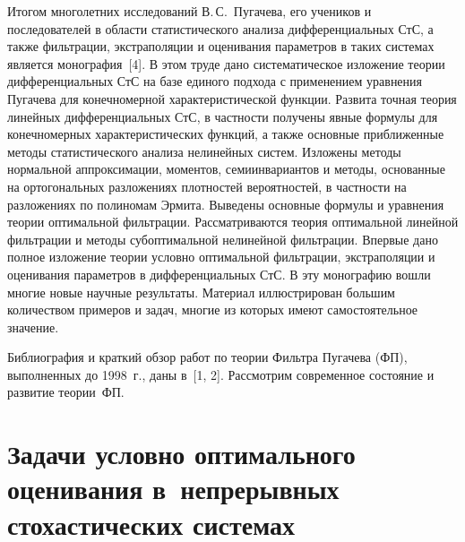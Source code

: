 \begin{multicols}{2}
Итогом многолетних исследований В.\,С.~Пугачева, его учеников и последователей 
в области статистического анализа дифференциальных СтС, а также фильтрации, 
экстраполяции и оценивания па\-ра\-мет\-ров в таких системах является 
монография~[4]. В этом труде дано систематическое изложение теории 
дифференциальных СтС на базе единого подхода с применением уравнения  Пугачева 
для конечномерной характеристической функции. Развита точная теория линейных 
дифференциальных СтС, в частности получены явные формулы для конечномерных 
характеристических функций, а также основные приближенные методы 
статистического анализа нелинейных систем. Изложены методы нормальной 
аппроксимации, моментов, семиинвариантов и методы, основанные на  ортогональных 
разложениях плотностей вероятностей, в частности на разложениях по полиномам 
Эрмита. Выведены основные формулы и уравнения теории оптимальной фильтрации. 
Рассматриваются теория оптимальной линейной фильтрации и методы субоптимальной 
нелинейной фильтрации. Впервые дано полное изложение теории условно оптимальной 
фильтрации, экстраполяции и оценивания па\-ра\-мет\-ров в дифференциальных СтС. 
В эту монографию вошли многие новые научные результаты. Материал иллюстрирован 
большим количеством примеров и задач, многие из которых имеют самостоятельное 
значение.

Библиография  и краткий обзор работ по теории Фильтра Пугачева (ФП), 
выполненных до 1998~г.,  даны в~[1, 2]. Рассмотрим современное состояние и 
развитие тео\-рии~ФП.

\section{Задачи условно оптимального оценивания
в~непрерывных стохастических системах}


\end{multicols}

